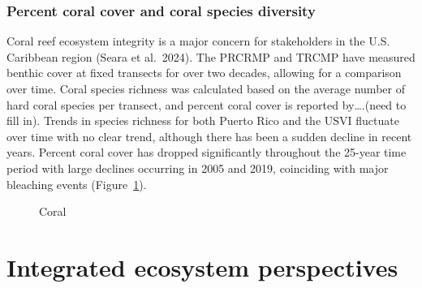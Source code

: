 \documentclass[
  letterpaper,
  oneside,
  open=any]{scrbook}
\begin{document}
\subsection{Percent coral cover and coral species
diversity}\label{percent-coral-cover-and-coral-species-diversity}

Coral reef ecosystem integrity is a major concern for stakeholders in
the U.S. Caribbean region (Seara et al.~2024). The PRCRMP and TRCMP have
measured benthic cover at fixed transects for over two decades, allowing
for a comparison over time. Coral species richness was calculated based
on the average number of hard coral species per transect, and percent
coral cover is reported by\ldots.(need to fill in). Trends in species
richness for both Puerto Rico and the USVI fluctuate over time with no
clear trend, although there has been a sudden decline in recent years.
Percent coral cover has dropped significantly throughout the 25-year
time period with large declines occurring in 2005 and 2019, coinciding
with major bleaching events (Figure~\ref{fig-coral}).

\begin{figure}


\caption{\label{fig-coral}Coral}

\end{figure}%


\chapter{Integrated ecosystem
perspectives}\label{integrated-ecosystem-perspectives}
\end{document}
